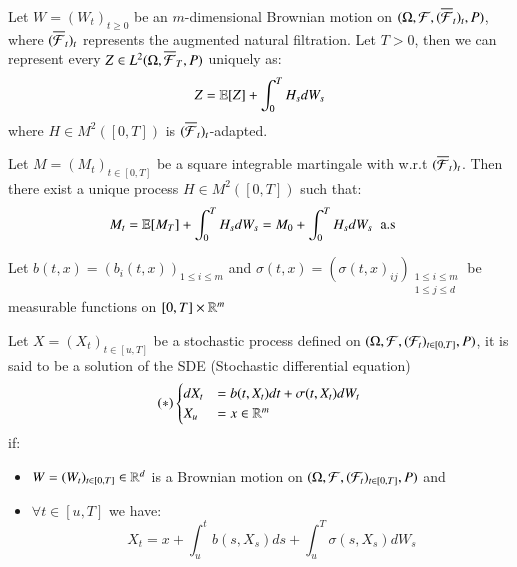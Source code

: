 \begin{theorem}
Let $W = (W_{t})_{t\geq 0}$ be an $m$-dimensional Brownian motion on $(\Omega, \mathcal{F}, (\overline{\mathcal{F}}_{t})_{t}, P)$, where $(\overline{\mathcal{F}}_{t})_{t}$ represents the augmented natural filtration. Let $T>0$, then we can represent every $Z\in L^{2}(\Omega, \overline{\mathcal{F}}_{T}, P)$ uniquely as: 
$$
Z = \mathbb{E}[Z] + \int_{0}^{T}H_{s}dW_{s}
$$
where $H \in M^{2}([0,T])$ is $(\overline{\mathcal{F}}_{t})_{t}$-adapted.
\end{theorem}

\begin{theorem}
\label{thm: Martingale_rep_thm}
Let $M = (M_{t})_{t \in [0,T]}$ be a square integrable martingale with w.r.t $(\overline{\mathcal{F}}_{t})_{t}$. Then there exist a unique process $H\in M^{2}([0,T])$ such that: 
\begin{align*}
M_{t} &= \mathbb{E}[M_{T}] + \int_{0}^{T}H_{s}dW_{s} 
= M_{0} + \int_{0}^{T}H_{s}dW_{s} \;\; \text{a.s}
\end{align*}
\end{theorem}

Let $b(t,x) = (b_{i}(t,x))_{1\leq i \leq m}$ and
$\sigma(t,x) = (\sigma(t,x)_{ij})_{\substack{1\leq i\leq m\\1\leq j\leq d}}$ be measurable functions on $[0,T]\times \mathbb{R}^{m}$
\begin{definition}
Let $X = (X_{t})_{t\in [u,T]}$ be a stochastic process defined on $(\Omega, \mathcal{F}, (\mathcal{F}_{t})_{t\in [0,T]}, P)$, it is said to be a solution of the SDE  (Stochastic differential equation)
\begin{align*}
(*)\begin{cases}
      dX_{t} &= b(t,X_{t})dt + \sigma(t,X_{t})dW_{t} \\
      X_{u} &= x \in \mathbb{R}^{m}
    \end{cases}       
\end{align*}
if: 
\begin{itemize}[leftmargin =*]
    \item $W = (W_{t})_{t\in [0,T]} \in \mathbb{R}^{d}$ is a Brownian motion on $(\Omega, \mathcal{F}, (\mathcal{F}_{t})_{t\in [0,T]}, P)$ and
    \item $\forall t \in [u,T]$ we have:
    $$
    X_{t} = x + \int_{u}^{t}b(s,X_{s})ds + \int_{u}^{T}\sigma(s,X_{s})dW_{s}
    $$
\end{itemize}
\end{definition}

